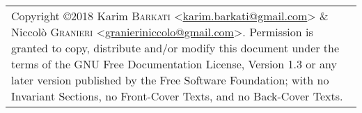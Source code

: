 \documentclass[a4paper, landscape, 9pt]{extarticle}
\newcommand{\email}[1]{\href{mailto:#1}{\textsf{#1}}}
\begin{document}
\begin{multicols}{3}
\begin{tabularx}{9cm}{>{\tt}l X}
  \end{tabularx}
  
  \medskip{} 
  \noindent{}
  \begin{tabularx}{9cm}{X}
    \tiny{Copyright \copyright{2018} Karim \textsc{Barkati} <\email{karim.barkati@gmail.com}> \& Niccolò \textsc{Granieri} <\email{granieriniccolo@gmail.com}>. Permission is granted to copy, distribute and/or modify this document under the terms of the GNU Free Documentation License, Version 1.3 or any later version published by the Free Software Foundation; with no Invariant Sections, no Front-Cover Texts, and no Back-Cover Texts.}
  \end{tabularx}


\end{multicols}
\end{document}
